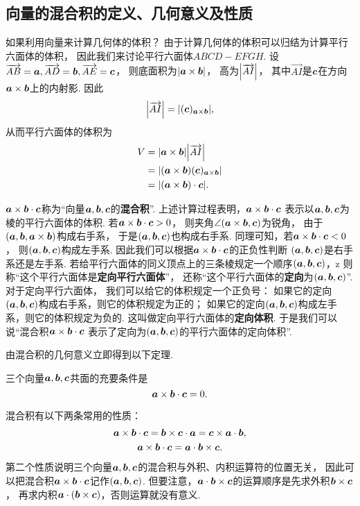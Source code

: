 \subsection{向量的混合积的定义、几何意义及性质}
如果利用向量来计算几何体的体积？
由于计算几何体的体积可以归结为计算平行六面体的体积，
因此我们来讨论平行六面体\(ABCD-EFGH\).
设\(\overrightarrow{AB}=\boldsymbol{a},
\overrightarrow{AD}=\boldsymbol{b},
\overrightarrow{AE}=\boldsymbol{c}\)，
则底面积为\(\abs{\boldsymbol{a}\times\boldsymbol{b}}\)，
高为\(\abs{\overrightarrow{AI}}\)，
其中\(\vec{AI}\)是\(\boldsymbol{c}\)在方向\(\boldsymbol{a}\times\boldsymbol{b}\)上的内射影.
因此\[
	\abs{\overrightarrow{AI}}
	= \abs{(\boldsymbol{c})_{\boldsymbol{a}\times\boldsymbol{b}}},
\]
从而平行六面体的体积为
\begin{align*}
	V &= \abs{\boldsymbol{a}\times\boldsymbol{b}} \abs{\overrightarrow{AI}} \\
	&= \abs{(\boldsymbol{a}\times\boldsymbol{b}) (\boldsymbol{c})_{\boldsymbol{a}\times\boldsymbol{b}}} \\
	&= \abs{(\boldsymbol{a}\times\boldsymbol{b})\cdot\boldsymbol{c}}.
\end{align*}

\(\boldsymbol{a}\times\boldsymbol{b}\cdot\boldsymbol{c}\)称为“向量\(\boldsymbol{a},\boldsymbol{b},\boldsymbol{c}\)的\textbf{混合积}”.
上述计算过程表明，\(\boldsymbol{a}\times\boldsymbol{b}\cdot\boldsymbol{c}\)
表示以\(\boldsymbol{a},\boldsymbol{b},\boldsymbol{c}\)为棱的平行六面体的体积.
若\(\boldsymbol{a}\times\boldsymbol{b}\cdot\boldsymbol{c}>0\)，
则夹角\(\angle(\boldsymbol{a}\times\boldsymbol{b},\boldsymbol{c})\)为锐角，
由于\((\boldsymbol{a},\boldsymbol{b},\boldsymbol{a}\times\boldsymbol{b})\)构成右手系，
于是\((\boldsymbol{a},\boldsymbol{b},\boldsymbol{c})\)也构成右手系.
同理可知，若\(\boldsymbol{a}\times\boldsymbol{b}\cdot\boldsymbol{c}<0\)，
则\((\boldsymbol{a},\boldsymbol{b},\boldsymbol{c})\)构成左手系.
因此我们可以根据\(\boldsymbol{a}\times\boldsymbol{b}\cdot\boldsymbol{c}\)的正负性判断
\((\boldsymbol{a},\boldsymbol{b},\boldsymbol{c})\)是右手系还是左手系.
若给平行六面体的同义顶点上的三条棱规定一个顺序\((\boldsymbol{a},\boldsymbol{b},\boldsymbol{c})\)，z
则称“这个平行六面体是\textbf{定向平行六面体}”，
还称“这个平行六面体的\textbf{定向}为\((\boldsymbol{a},\boldsymbol{b},\boldsymbol{c})\)”.
对于定向平行六面体，
我们可以给它的体积规定一个正负号：
如果它的定向\((\boldsymbol{a},\boldsymbol{b},\boldsymbol{c})\)构成右手系，则它的体积规定为正的；
如果它的定向\((\boldsymbol{a},\boldsymbol{b},\boldsymbol{c})\)构成左手系，则它的体积规定为负的.
这叫做定向平行六面体的\textbf{定向体积}.
于是我们可以说“混合积\(\boldsymbol{a}\times\boldsymbol{b}\cdot\boldsymbol{c}\)
表示了定向为\((\boldsymbol{a},\boldsymbol{b},\boldsymbol{c})\)的平行六面体的定向体积”.

由混合积的几何意义立即得到以下定理.
\begin{theorem}
三个向量\(\boldsymbol{a},\boldsymbol{b},\boldsymbol{c}\)共面的充要条件是\[
	\boldsymbol{a}\times\boldsymbol{b}\cdot\boldsymbol{c} = 0.
\]
\end{theorem}

混合积有以下两条常用的性质：
\begin{gather}
	\boldsymbol{a}\times\boldsymbol{b}\cdot\boldsymbol{c}
	= \boldsymbol{b}\times\boldsymbol{c}\cdot\boldsymbol{a}
	= \boldsymbol{c}\times\boldsymbol{a}\cdot\boldsymbol{b}, \\
	\boldsymbol{a}\times\boldsymbol{b}\cdot\boldsymbol{c}
	= \boldsymbol{a}\cdot\boldsymbol{b}\times\boldsymbol{c}.
\end{gather}
第二个性质说明三个向量\(\boldsymbol{a},\boldsymbol{b},\boldsymbol{c}\)的混合积与外积、内积运算符的位置无关，
因此可以把混合积\(\boldsymbol{a}\times\boldsymbol{b}\cdot\boldsymbol{c}\)记作\((\boldsymbol{a},\boldsymbol{b},\boldsymbol{c})\).
但要注意，\(\boldsymbol{a}\cdot\boldsymbol{b}\times\boldsymbol{c}\)的运算顺序是先求外积\(\boldsymbol{b}\times\boldsymbol{c}\)，
再求内积\(\boldsymbol{a}\cdot(\boldsymbol{b}\times\boldsymbol{c})\)，否则运算就没有意义.

